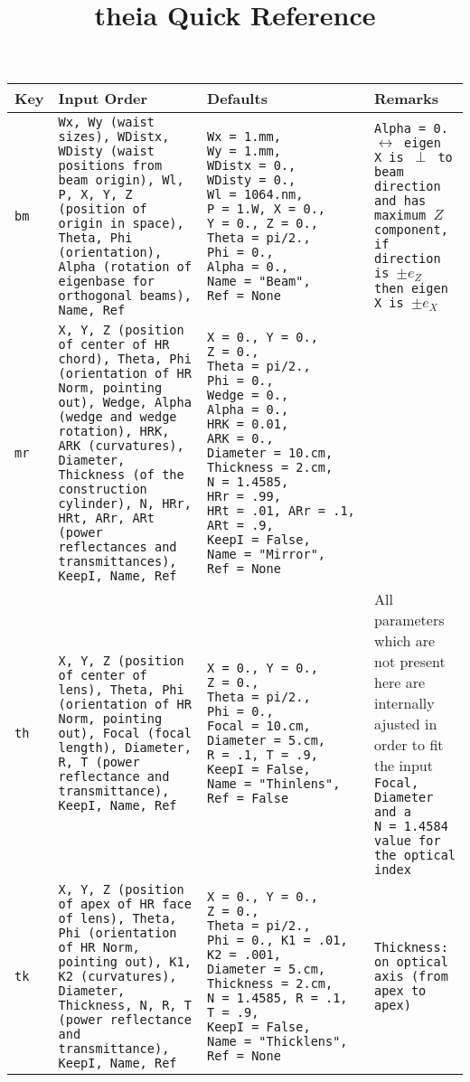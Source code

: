\documentclass[a4paper, landscape]{article}
\title{theia Quick Reference}
\begin{document}
\begin{tabular}{| p{.6cm} | p{7cm}| p{6cm} | p{5cm} |}
\hline
\textbf{Key} & \textbf{Input Order} & \textbf{Defaults} & \textbf{Remarks} \\ \hline \hline

\tt{bm} & \tt{Wx}, \tt{Wy} (waist sizes), \tt{WDistx}, \tt{WDisty} (waist positions from beam origin), \tt{Wl}, \tt{P}, \tt{X}, \tt{Y}, \tt{Z} (position of origin in space), \tt{Theta}, \tt{Phi} (orientation), \tt{Alpha} (rotation of eigenbase for orthogonal beams), \tt{Name}, \tt{Ref}  & \tt{Wx}~=~1.mm, \tt{Wy}~=~1.mm, \tt{WDistx}~=~0., \tt{WDisty}~=~0., \tt{Wl}~=~1064.nm, \tt{P}~=~1.W, \tt{X}~=~0., \tt{Y}~=~0., \tt{Z}~=~0., \tt{Theta}~=~pi/2., \tt{Phi}~=~0., \tt{Alpha}~=~0., \tt{Name}~=~"Beam", \tt{Ref}~=~None & \tt{Alpha = 0.} $\leftrightarrow$ eigen X is $\perp$ to beam direction and has maximum $Z$ component, if direction is $\pm e_Z$ then eigen X is $\pm e_X$\\ \hline

\tt{mr} & \tt{X}, \tt{Y}, \tt{Z} (position of center of HR chord), \tt{Theta}, \tt{Phi} (orientation of HR Norm, pointing out), \tt{Wedge}, \tt{Alpha} (wedge and wedge rotation), \tt{HRK}, \tt{ARK} (curvatures), \tt{Diameter}, \tt{Thickness} (of the construction cylinder), \tt{N}, \tt{HRr}, \tt{HRt}, \tt{ARr}, \tt{ARt} (power reflectances and transmittances), \tt{KeepI}, \tt{Name}, \tt{Ref} & \tt{X}~=~0., \tt{Y}~=~0., \tt{Z}~=~0., \tt{Theta}~=~pi/2., \tt{Phi}~=~0., \tt{Wedge}~=~0., \tt{Alpha}~=~0., \tt{HRK}~=~0.01, \tt{ARK}~=~0., \tt{Diameter}~=~10.cm, \tt{Thickness}~=~2.cm, \tt{N}~=~1.4585, \tt{HRr}~=~.99, \tt{HRt}~=~.01, \tt{ARr}~=~.1, \tt{ARt}~=~.9, \tt{KeepI}~=~False, \tt{Name}~=~"Mirror", \tt{Ref}~=~None & \\ \hline

\tt{th} & \tt{X}, \tt{Y}, \tt{Z} (position of center of lens), \tt{Theta}, \tt{Phi} (orientation of HR Norm, pointing out), \tt{Focal} (focal length),  \tt{Diameter}, \tt{R}, \tt{T} (power reflectance and transmittance), \tt{KeepI}, \tt{Name}, \tt{Ref} & \tt{X}~=~0., \tt{Y}~=~0., \tt{Z}~=~0., \tt{Theta}~=~pi/2., \tt{Phi}~=~0., \tt{Focal}~=~10.cm,  \tt{Diameter}~=~5.cm, \tt{R}~=~.1, \tt{T}~=~.9, \tt{KeepI}~=~False, \tt{Name}~=~"Thinlens", \tt{Ref}~=~False & All parameters which are not present here are internally ajusted in order to fit the input \tt{Focal}, \tt{Diameter} and a \tt{N}~=~1.4584 value for the optical index\\ \hline

\tt{tk} & \tt{X}, \tt{Y}, \tt{Z} (position of apex of HR face of lens), \tt{Theta}, \tt{Phi} (orientation of HR Norm, pointing out), \tt{K1}, \tt{K2} (curvatures), \tt{Diameter},  \tt{Thickness}, \tt{N}, \tt{R}, \tt{T} (power reflectance and transmittance), \tt{KeepI}, \tt{Name}, \tt{Ref} & \tt{X}~=~0., \tt{Y}~=~0., \tt{Z}~=~0., \tt{Theta}~=~pi/2., \tt{Phi}~=~0., \tt{K1}~=~.01, \tt{K2}~=~.001, \tt{Diameter}~=~5.cm,  \tt{Thickness}~=~2.cm, \tt{N}~=~1.4585, \tt{R}~=~.1, \tt{T}~=~.9, \tt{KeepI}~=~False, \tt{Name}~=~"Thicklens", \tt{Ref}~=~None & \tt{Thickness}: on optical axis (from apex to apex) \\ \hline


\end{tabular}
\end{document}
